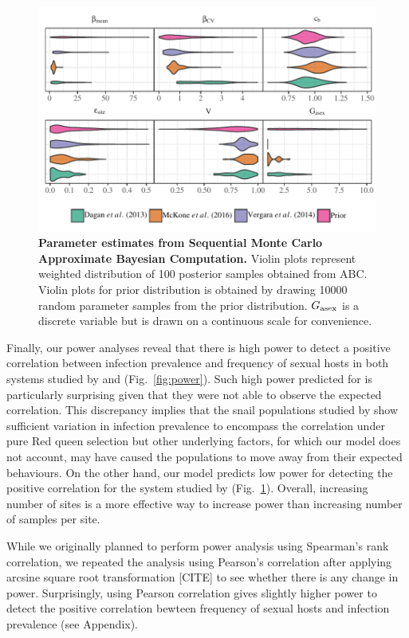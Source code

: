 \documentclass{article}\usepackage[]{graphicx}\usepackage[]{color}
\newcommand{\fref}[1]{Fig.~\ref{fig:#1}}
\begin{document}
\begin{figure}[!ht]
\includegraphics[width=\textwidth]{../fig/posterior.pdf}
\caption{{\bf Parameter estimates from Sequential Monte Carlo Approximate Bayesian Computation.}
Violin plots represent weighted distribution of 100 posterior samples obtained from ABC.
Violin plots for prior distribution is obtained by drawing 10000 random parameter samples from the prior distribution.
$G_{\tiny \textrm{asex}}$ is a discrete variable but is drawn on a continuous scale for convenience.
}
\label{fig:smcparam}
\end{figure}

Finally, our power analyses reveal that there is high power to detect a positive correlation between infection prevalence and frequency of sexual hosts in both systems studied by \cite{dagan2013clonal} and \cite{mckone2016fine} (\fref{power}).
Such high power predicted for \cite{dagan2013clonal} is particularly surprising given that they were not able to observe the expected correlation.
This discrepancy implies that the snail populations studied by \cite{dagan2013clonal} show sufficient variation in infection prevalence to encompass the correlation under pure Red queen selection but other underlying factors, for which our model does not account, may have caused the populations to move away from their expected behaviours.
On the other hand, our model predicts low power for detecting the positive correlation for the system studied by \cite{vergara2014infection} (\fref{smcparam}).
Overall, increasing number of sites is a more effective way to increase power than increasing number of samples per site.

While we originally planned to perform power analysis using Spearman's rank correlation,
we repeated the analysis using Pearson's correlation after applying arcsine square root transformation [CITE] to see whether there is any change in power.
Surprisingly, using Pearson correlation gives slightly higher power to detect the positive correlation bewteen frequency of sexual hosts and infection prevalence (see Appendix).
\end{document}
